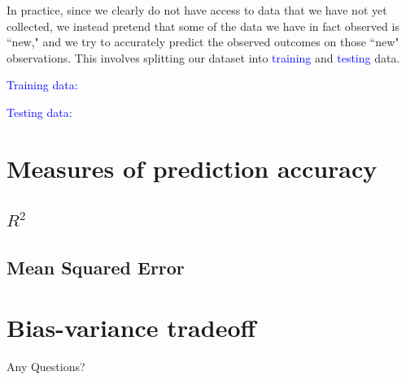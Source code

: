 \documentclass[10pt,t]{beamer}
\begin{document}
\begin{frame}
In practice, since we clearly do not have access to data that we have not yet collected, we instead pretend that some of the data we have in fact observed is ``new," and we try to accurately predict the observed outcomes on those ``new" observations. This involves splitting our dataset into \textcolor{blue}{training} and \textcolor{blue}{testing} data.

\vspace{0.3cm}

\textcolor{blue}{Training data:}

\vspace{0.3cm}

\textcolor{blue}{Testing data:}
\end{frame}

\section{Measures of prediction accuracy}

\subsection{$R^2$}
\subsection{Mean Squared Error}

\section{Bias-variance tradeoff}



\begin{frame}[c]
\centering \huge Any Questions?
\end{frame}
\end{document}
